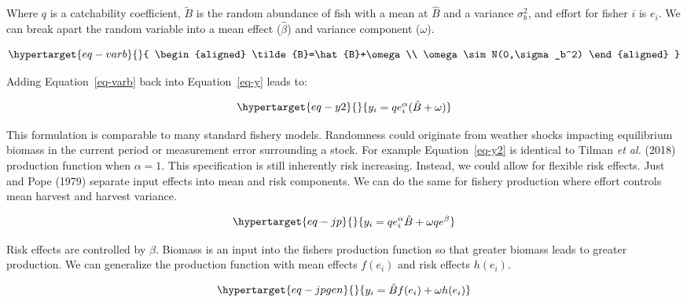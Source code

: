 \documentclass[
  letterpaper,
  DIV=11,
  numbers=noendperiod]{scrartcl}
\theoremstyle{plain}
\theoremstyle{plain}
\theoremstyle{remark}
\begin{document}
Where \(q\) is a catchability coefficient, \(\tilde{B}\) is the random
abundance of fish with a mean at \(\hat{B}\) and a variance
\(\sigma_b^2\), and effort for fisher \(i\) is \(e_i\). We can break
apart the random variable into a mean effect (\(\hat{\beta}\)) and
variance component (\(\omega\)).

\begin{equation}\protect\hypertarget{eq-varb}{}{
\begin{aligned}
\tilde{B}=\hat{B}+\omega \\
\omega\sim N(0,\sigma_b^2)
\end{aligned}
}\label{eq-varb}\end{equation}

Adding Equation~\ref{eq-varb} back into Equation~\ref{eq-y} leads to:

\begin{equation}\protect\hypertarget{eq-y2}{}{
\begin{aligned}
y_i=qe_i^\alpha(\hat{B}+\omega)
\end{aligned}
}\label{eq-y2}\end{equation}

This formulation is comparable to many standard fishery models.
Randomness could originate from weather shocks impacting equilibrium
biomass in the current period or measurement error surrounding a stock.
For example Equation~\ref{eq-y2} is identical to Tilman \emph{et al.}
(2018) production function when \(\alpha=1\). This specification is
still inherently risk increasing. Instead, we could allow for flexible
risk effects. Just and Pope (1979) separate input effects into mean and
risk components. We can do the same for fishery production where effort
controls mean harvest and harvest variance.

\begin{equation}\protect\hypertarget{eq-jp}{}{
\begin{aligned}
y_i=qe_i^\alpha\hat{B}+\omega qe^\beta
\end{aligned}
}\label{eq-jp}\end{equation}

Risk effects are controlled by \(\beta\). Biomass is an input into the
fishers production function so that greater biomass leads to greater
production. We can generalize the production function with mean effects
\(f(e_i)\) and risk effects \(h(e_i)\).

\begin{equation}\protect\hypertarget{eq-jpgen}{}{
\begin{aligned}
y_i=\hat{B}f(e_i)+\omega h(e_i)
\end{aligned}
}\label{eq-jpgen}\end{equation}
\end{document}
